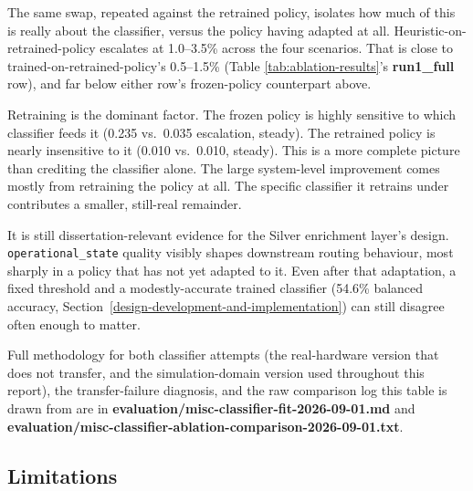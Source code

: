The same swap, repeated against the retrained policy, isolates how
much of this is really about the classifier, versus the policy
having adapted at all. Heuristic-on-retrained-policy escalates at
1.0--3.5\% across the four scenarios. That is close to
trained-on-retrained-policy's 0.5--1.5\% (Table
\ref{tab:ablation-results}'s \textbf{run1\_full} row), and far below
either row's frozen-policy counterpart above.

Retraining is the dominant factor. The frozen policy is highly
sensitive to which classifier feeds it (0.235 vs.\ 0.035 escalation,
steady). The retrained policy is nearly insensitive to it (0.010 vs.\
0.010, steady). This is a more complete picture than crediting the
classifier alone. The large system-level improvement
comes mostly from retraining the policy at all. The specific
classifier it retrains under contributes a smaller, still-real
remainder.

It is still dissertation-relevant evidence for the Silver enrichment
layer's design. \texttt{operational\_state} quality visibly shapes
downstream routing behaviour, most sharply in a policy that has not
yet adapted to it. Even after that adaptation, a fixed threshold and a
modestly-accurate trained classifier (54.6\% balanced accuracy,
Section~\ref{design-development-and-implementation}) can still disagree often enough to matter.

Full methodology for both classifier attempts (the real-hardware
version that does not transfer, and the simulation-domain version used
throughout this report), the transfer-failure diagnosis, and the raw
comparison log this table is drawn from are in
\textbf{evaluation/misc-classifier-fit-2026-09-01.md} and
\textbf{evaluation/misc-classifier-ablation-comparison-2026-09-01.txt}.

\hypertarget{limitations}{%
\subsection{Limitations}\label{limitations}}

